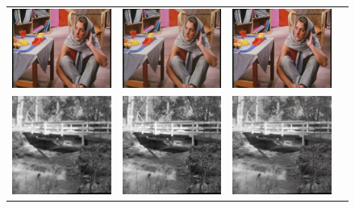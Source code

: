 \documentclass[10pt,twocolumn,letterpaper]{article}
\begin{document}
\begin{figure}[h!]
\begin{tabular}{cccc}
     	\includegraphics[width=1.5in]{images/used/appendix/jpg/Set14/barbara_SRResNet-MSE} &
     	\includegraphics[width=1.5in]{images/used/appendix/jpg/Set14/barbara_SRGAN-VGG54} &
     	\includegraphics[width=1.5in]{images/used/appendix/jpg/Set14/barbara_HR} \\
     	\includegraphics[width=1.5in]{images/used/appendix/jpg/Set14/bridge_bicubic}&
     	\includegraphics[width=1.5in]{images/used/appendix/jpg/Set14/bridge_SRResNet-MSE} &
     	\includegraphics[width=1.5in]{images/used/appendix/jpg/Set14/bridge_SRGAN-VGG54} &

\end{tabular}
\end{figure}
\end{document}
